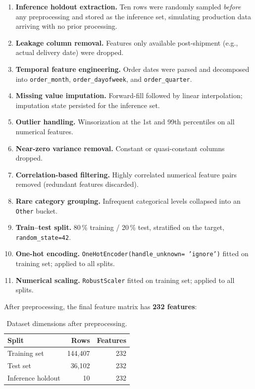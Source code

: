 \documentclass[12pt,a4paper]{article}
\begin{document}
\begin{enumerate}[leftmargin=2em,itemsep=3pt]
  \item \textbf{Inference holdout extraction.} Ten rows were randomly sampled
        \emph{before} any preprocessing and stored as the inference set,
        simulating production data arriving with no prior processing.
  \item \textbf{Leakage column removal.} Features only available
        post-shipment (e.g., actual delivery date) were dropped.
  \item \textbf{Temporal feature engineering.} Order dates were parsed and
        decomposed into \texttt{order\_month}, \texttt{order\_dayofweek},
        and \texttt{order\_quarter}.
  \item \textbf{Missing value imputation.} Forward-fill followed by linear
        interpolation; imputation state persisted for the inference set.
  \item \textbf{Outlier handling.} Winsorization at the 1st and 99th
        percentiles on all numerical features.
  \item \textbf{Near-zero variance removal.} Constant or quasi-constant
        columns dropped.
  \item \textbf{Correlation-based filtering.} Highly correlated numerical
        feature pairs removed (redundant features discarded).
  \item \textbf{Rare category grouping.} Infrequent categorical levels
        collapsed into an \texttt{Other} bucket.
  \item \textbf{Train--test split.} 80\,\% training / 20\,\% test,
        stratified on the target, \texttt{random\_state=42}.
  \item \textbf{One-hot encoding.} \texttt{OneHotEncoder(handle\_unknown=
        'ignore')} fitted on training set; applied to all splits.
  \item \textbf{Numerical scaling.} \texttt{RobustScaler} fitted on training
        set; applied to all splits.
\end{enumerate}

After preprocessing, the final feature matrix has \textbf{232 features}:

\begin{table}[H]
\centering
\caption{Dataset dimensions after preprocessing.}
\label{tab:dataset_dims}
\begin{tabular}{lrr}
\toprule
\textbf{Split} & \textbf{Rows} & \textbf{Features} \\
\midrule
Training set   & 144,407 & 232 \\
Test set       &  36,102 & 232 \\
Inference holdout &    10 & 232 \\
\bottomrule
\end{tabular}
\end{table}
\end{document}
